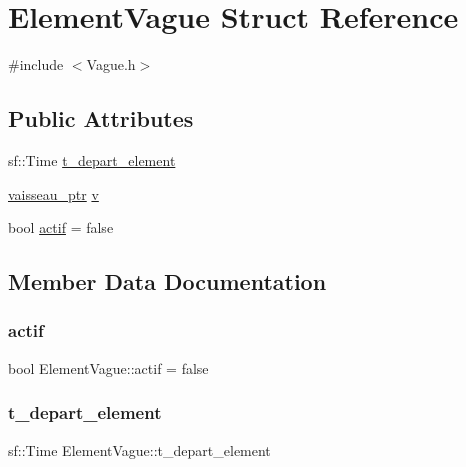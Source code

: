 \hypertarget{struct_element_vague}{}\section{Element\+Vague Struct Reference}
\label{struct_element_vague}


{\ttfamily \#include $<$Vague.\+h$>$}

\subsection*{Public Attributes}
\begin{DoxyCompactItemize}
\item 
sf\+::\+Time \mbox{\hyperlink{struct_element_vague_a0646173d1a72d9b8c112b65cf84fbca6}{t\+\_\+depart\+\_\+element}}
\item 
\mbox{\hyperlink{def__type_8h_a03925a047830157ad843b4224e7f63ba}{vaisseau\+\_\+ptr}} \mbox{\hyperlink{struct_element_vague_a3a5d7caa8fd21beb1634299624271072}{v}}
\item 
bool \mbox{\hyperlink{struct_element_vague_a601271018c10e6956e78c0268b245790}{actif}} = false
\end{DoxyCompactItemize}


\subsection{Member Data Documentation}
\mbox{\label{struct_element_vague_a601271018c10e6956e78c0268b245790}} 
\subsubsection{\texorpdfstring{actif}{actif}}
{\footnotesize\ttfamily bool Element\+Vague\+::actif = false}

\mbox{\label{struct_element_vague_a0646173d1a72d9b8c112b65cf84fbca6}} 
\subsubsection{\texorpdfstring{t\+\_\+depart\+\_\+element}{t\_depart\_element}}
{\footnotesize\ttfamily sf\+::\+Time Element\+Vague\+::t\+\_\+depart\+\_\+element}

